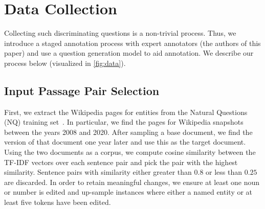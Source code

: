 \section{Data Collection}
\label{Data Collection}
Collecting such discriminating questions is a non-trivial process. Thus, we introduce a staged annotation process with expert annotators (the authors of this paper) and use a question generation model to aid annotation. We describe our process below (visualized in \autoref{fig:data}).








\subsection{Input Passage Pair Selection}\label{sec:initial_data}
First, we extract the Wikipedia pages for entities from the Natural Questions (NQ) training set~\citep{kwiatkowski-etal-2019-natural}. In particular, we find the pages for Wikipedia snapshots between the years 2008 and 2020. After sampling a base document, we find the version of that document one year later and use this as the target document. Using the two documents as a corpus, we compute cosine similarity between the TF-IDF vectors over each sentence pair and pick the pair with the highest similarity.
Sentence pairs with similarity either greater than $0.8$ or less than $0.25$ are discarded. In order to retain meaningful changes, we ensure at least one noun or number is edited and up-sample instances where either a named entity or at least five tokens have been edited. 


